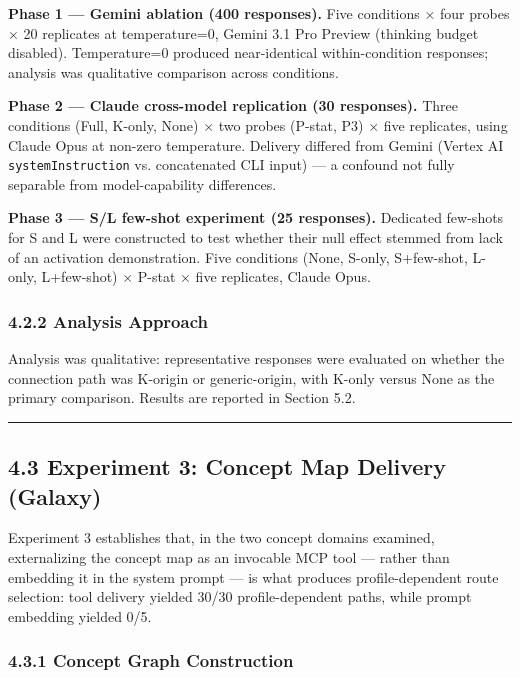 \documentclass[
]{article}
\begin{document}
\textbf{Phase 1 --- Gemini ablation (400 responses).} Five conditions × four probes × 20 replicates at temperature=0, Gemini 3.1 Pro Preview (thinking budget disabled). Temperature=0 produced near-identical within-condition responses; analysis was qualitative comparison across conditions.

\textbf{Phase 2 --- Claude cross-model replication (30 responses).} Three conditions (Full, K-only, None) × two probes (P-stat, P3) × five replicates, using Claude Opus at non-zero temperature. Delivery differed from Gemini (Vertex AI \texttt{systemInstruction} vs. concatenated CLI input) --- a confound not fully separable from model-capability differences.

\textbf{Phase 3 --- S/L few-shot experiment (25 responses).} Dedicated few-shots for S and L were constructed to test whether their null effect stemmed from lack of an activation demonstration. Five conditions (None, S-only, S+few-shot, L-only, L+few-shot) × P-stat × five replicates, Claude Opus.

\subsubsection{4.2.2 Analysis Approach}\label{422-analysis-approach}

Analysis was qualitative: representative responses were evaluated on whether the connection path was K-origin or generic-origin, with K-only versus None as the primary comparison. Results are reported in Section 5.2.

\begin{center}\rule{0.5\linewidth}{0.5pt}\end{center}

\subsection{4.3 Experiment 3: Concept Map Delivery (Galaxy)}\label{43-experiment-3-concept-map-delivery-galaxy}

Experiment 3 establishes that, in the two concept domains examined, externalizing the concept map as an invocable MCP tool --- rather than embedding it in the system prompt --- is what produces profile-dependent route selection: tool delivery yielded 30/30 profile-dependent paths, while prompt embedding yielded 0/5.

\subsubsection{4.3.1 Concept Graph Construction}\label{431-concept-graph-construction}
\end{document}
